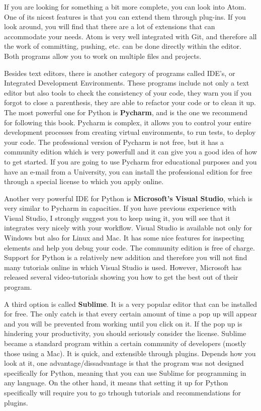 If you are looking for something a bit more complete, you can look into Atom. One of its nicest features is that you can extend them through plug-ins. If you look around, you will find that there are a lot of extensions that can accommodate your needs. Atom is very well integrated with Git, and therefore all the work of committing, pushing, etc. can be done directly within the editor. Both programs allow you to work on multiple files and projects.

Besides text editors, there is another category of programs called IDE’s, or Integrated Development Environments. These programs include not only a text editor but also tools to check the consistency of your code, they warn you if you forgot to close a parenthesis, they are able to refactor your code or to clean it up. The most powerful one for Python is \textbf{Pycharm}, and is the one we recommend for following this book. Pycharm is complex, it allows you to control your entire development processes from creating virtual environments, to run tests, to deploy your code. The professional version of Pycharm is not free, but it has a community edition which is very powerfull and it can give you a good idea of how to get started. If you are going to use Pycharm fror educational purposes and you have an e-mail from a University, you can install the professional edition for free through a special license to which you apply online.

Another very powerful IDE for Python is \textbf{Microsoft’s Visual Studio}, which is very similar to Pycharm in capacities. If you have previous experience with Visual Studio, I strongly suggest you to keep using it, you will see that it integrates very nicely with your workflow. Visual Studio is available not only for Windows but also for Linux and Mac. It has some nice features for inspecting elements and help you debug your code. The community edition is free of charge. Support for Python is a relatively new addition and therefore you will not find many tutorials online in which Visual Studio is used. However, Microsoft has released several video-tutorials showing you how to get the best out of their program. 

A third option is called \textbf{Sublime}. It is a very popular editor that can be installed for free. The only catch is that every certain amount of time a pop up will appear and you will be prevented from working until you click on it. If the pop up is hindering your productivity, you should seriously consider the license. Sublime became a standard program within a certain community of developers (mostly those using a Mac). It is quick, and extensible through plugins. Depends how you look at it, one advantage/dissadvantage is that the program was not designed specifically for Python, meaning that you can use Sublime for programming in any language. On the other hand, it means that setting it up for Python specifically will require you to go trhough tutorials and recommendations for plugins. 

